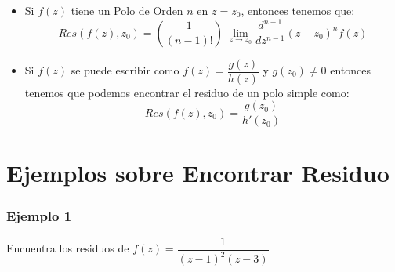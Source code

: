 \documentclass[12pt, fleqn]{report}                             %
\newenvironment{SmallIndentation}[1][0.75em]                    %
    {\begin{adjustwidth}{#1}{}\begin{footnotesize}}                 %
    {\end{footnotesize}\end{adjustwidth}}                           %
\newcommand{\Wrap}[1]{\left( #1 \right)}                        %
\newcommand{\pfrac}[2]{\Wrap{\dfrac{#1}{#2}}}                   %
\newcommand \MiniUpperDerivate[2]                               %
        {\dfrac{d^{#2}}{d#1^{#2}}}                                  %
\begin{document}
\begin{itemize}
\begin{SmallIndentation}[1em]
                        \end{SmallIndentation}


                    \item 
                        Si $f(z)$ tiene un Polo de Orden $n$ en $z = z_0$, entonces
                        tenemos que:
                        \begin{equation*}
                            Res(f(z), z_0) = \pfrac{1}{(n-1)!} \;
                                \lim_{z \to z_0} \MiniUpperDerivate{z}{n-1}(z - z_0)^n f(z)
                        \end{equation*} 


                    \item 
                        Si $f(z)$ se puede escribir como $f(z) = \dfrac{g(z)}{h(z)}$
                        y $g(z_0) \neq 0$ entonces tenemos que podemos encontrar el residuo de un
                        polo simple como:
                        \begin{equation*}
                            Res(f(z), z_0) = \dfrac{g(z_0)}{h'(z_0)}
                        \end{equation*}

                            
                \end{itemize}



            \clearpage
            \section{Ejemplos sobre Encontrar Residuo}


                \subsubsection{Ejemplo 1}

                    Encuentra los residuos de $f(z) = \dfrac{1}{(z-1)^2 (z-3)}$
\end{document}
